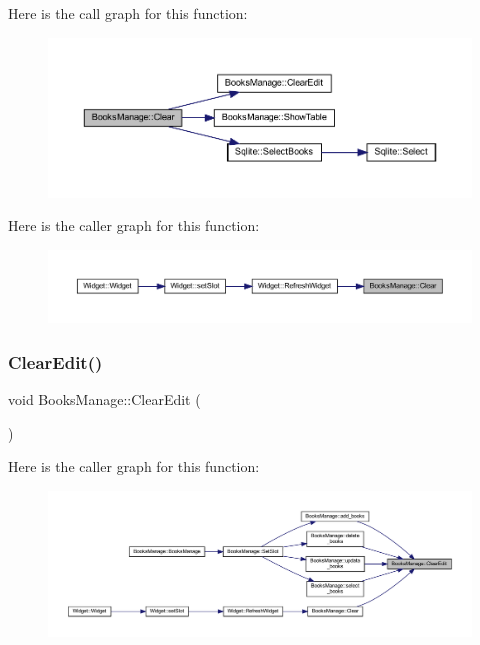 Here is the call graph for this function\+:
\nopagebreak
\begin{figure}[H]
\begin{center}
\leavevmode
\includegraphics[width=350pt]{class_books_manage_a8388b6b8547cc759a9976c1a567aab0a_cgraph}
\end{center}
\end{figure}
Here is the caller graph for this function\+:
\nopagebreak
\begin{figure}[H]
\begin{center}
\leavevmode
\includegraphics[width=350pt]{class_books_manage_a8388b6b8547cc759a9976c1a567aab0a_icgraph}
\end{center}
\end{figure}
\mbox{\label{class_books_manage_aa5b813a7fb68aa61a143f84c87699c83}} 
\subsubsection{\texorpdfstring{ClearEdit()}{ClearEdit()}}
{\footnotesize\ttfamily void Books\+Manage\+::\+Clear\+Edit (\begin{DoxyParamCaption}{ }\end{DoxyParamCaption})}

Here is the caller graph for this function\+:
\nopagebreak
\begin{figure}[H]
\begin{center}
\leavevmode
\includegraphics[width=350pt]{class_books_manage_aa5b813a7fb68aa61a143f84c87699c83_icgraph}
\end{center}
\end{figure}
\mbox{\label{class_books_manage_ae8adc7f70a2e95f5a5991137e11a18ae}} 
